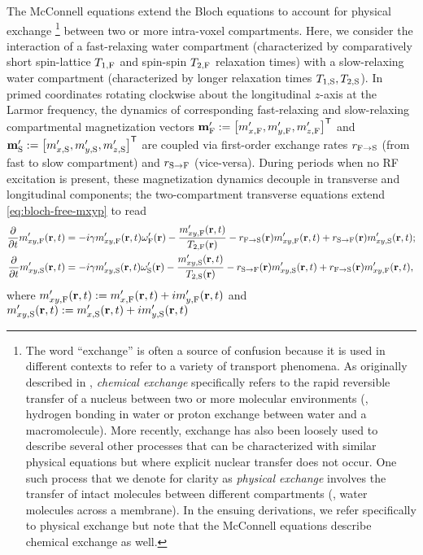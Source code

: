 The McConnell equations \cite{mcconnell:58:rrb}
extend the Bloch equations \cite{bloch:1946:ni-paper}
to account for physical exchange
\footnote{%
	The word ``exchange'' 
  is often a source of confusion 
  because it is used in different contexts
  to refer to a variety of transport phenomena.
  As originally described in \cite{mcconnell:58:rrb},
  \emph{chemical exchange} specifically refers 
  to the rapid reversible transfer
  of a nucleus 
  between two or more molecular environments
  (\eg, hydrogen bonding in water
  or proton exchange 
  between water and a macromolecule). 
  More recently,
  exchange has also been loosely used 
  to describe several other processes
  that can be characterized
  with similar physical equations
  but where explicit nuclear transfer does not occur.
  One such process
  that we denote for clarity
  as \emph{physical exchange}
  involves the transfer
  of intact molecules 
  between different compartments
  (\eg, water molecules across a membrane).
  In the ensuing derivations,
  we refer specifically
  to physical exchange
  but note that the McConnell equations
  describe chemical exchange as well.
}
between two or more intra-voxel compartments.
Here,
we consider the interaction
of a fast-relaxing water compartment
(characterized by comparatively short spin-lattice $T_{1,\mathrm{F}}$ 
and spin-spin $T_{2,\mathrm{F}}$ relaxation times) 
with a slow-relaxing water compartment
(characterized by longer relaxation times $T_{1,\mathrm{S}},T_{2,\mathrm{S}}$).
In primed coordinates rotating clockwise 
about the longitudinal $z$-axis
at the Larmor frequency,
the dynamics 
of corresponding fast-relaxing and slow-relaxing
compartmental magnetization vectors
$\bmmpf := \brac{\mxpf, \mypf, \mzpf}\tpose$
and
$\bmmps := \brac{\mxps, \myps, \mzps}\tpose$
are coupled via first-order exchange rates 
$r_{\mathrm{F}\to\mathrm{S}}$ (from fast to slow compartment) 
and $r_{\mathrm{S}\to\mathrm{F}}$ (vice-versa).
During periods when no RF excitation is present,
these magnetization dynamics
decouple in transverse and longitudinal components;
the two-compartment transverse equations 
extend \eqref{eq:bloch-free-mxyp} to read
\begin{align}
	\dela{t} \mxypf\prt &= 
		-i\gam \mxypf\prt \ompf\pr - \frac{\mxypf\prt}{\tf{2}\pr} 
		- \rfs\pr \mxypf\prt + \rsf\pr \mxyps\prt;
		\label{eq:mwf,mxy-f} \\
	\dela{t} \mxyps\prt &= 
		-i\gam \mxyps\prt \omps\pr - \frac{\mxyps\prt}{\ts{2}\pr} 
		- \rsf\pr \mxyps\prt + \rfs\pr \mxypf\prt,
		\label{eq:mwf,mxy-s}
\end{align}
where 
$\mxypf\prt := \mxpf\prt + i\mypf\prt$ 
and $\mxyps\prt := \mxps\prt + i\myps\prt$
